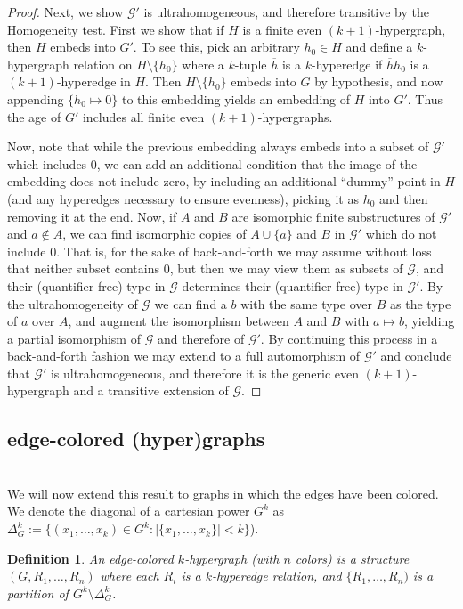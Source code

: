 \documentclass{amsart}
\newtheorem{definition}[theorem]{Definition}
\def\graph{\mathcal{G}}
\newcommand{\set}[1]{\{#1 \}}
\begin{document}
\begin{proof}
    Next, we show $\mathcal{G}'$ is ultrahomogeneous, and therefore transitive by the Homogeneity test. First we show that if $H$ is a finite even $(k+1)$-hypergraph, then $H$ embeds into $G'$. To see this, pick an arbitrary $h_0 \in H$ and define a $k$-hypergraph relation on $H \setminus \set{h_0}$ where a $k$-tuple $\overline{h}$ is a $k$-hyperedge if $\overline{h}h_0$ is a $(k+1)$-hyperedge in $H$. Then $H \setminus \set{h_0}$ embeds into $G$ by hypothesis, and now appending $\set{h_0 \mapsto 0}$ to this embedding yields an embedding of $H$ into $G'$. Thus the age of $G'$ includes all finite even $(k+1)$-hypergraphs. 
    
    Now, note that while the previous embedding always embeds into a subset of $\graph'$ which includes 0, we can add an additional condition that the image of the embedding does not include zero, by including an additional ``dummy'' point in $H$ (and any hyperedges necessary to ensure evenness), picking it as $h_0$ and then removing it at the end. Now, if $A$ and $B$ are isomorphic finite substructures of $\graph'$ and $a\not \in A$, we can find isomorphic copies of $A \cup \set{a}$ and $B$ in $\graph'$ which do not include 0. That is, for the sake of back-and-forth we may assume without loss that neither subset contains 0, but then we may view them as subsets of $\graph$, and their (quantifier-free) type in $\graph$ determines their (quantifier-free) type in $\graph'$. By the ultrahomogeneity of $\graph$ we can find a $b$ with the same type over $B$ as the type of $a$ over $A$, and augment the isomorphism between $A$ and $B$ with $a \mapsto b$, yielding a partial isomorphism of $\graph$ and therefore of $\graph'$. By continuing this process in a back-and-forth fashion we may extend to a full automorphism of $\graph'$ and conclude that $\graph'$ is ultrahomogeneous, and therefore it is the generic even $(k+1)$-hypergraph and a transitive extension of $\graph$.
\end{proof}


\subsection{edge-colored (hyper)graphs}\hfill\\

We will now extend this result to graphs in which the edges have been colored. We denote the diagonal of a cartesian power $G^k$ as $\Delta^k_G := \set{(x_1, \dots, x_k)\in G^k: |\set{x_1, \dots, x_k}|<k } $).

\begin{definition}
    An edge-colored $k$-hypergraph (with $n$ colors) is a structure $(G, R_1, \dots, R_n)$ where each $R_i$ is a $k$-hyperedge relation, and $\{R_1, \dots, R_n)$ is a partition of $G^k \setminus \Delta^k_G$.
\end{definition}
\end{document}
